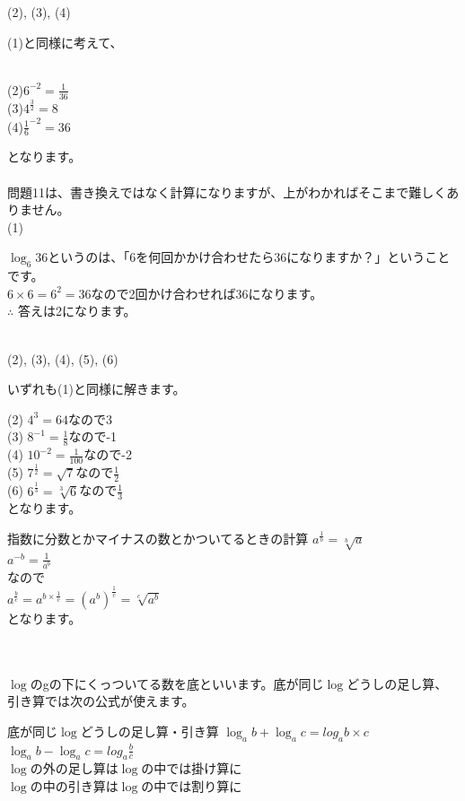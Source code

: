 \documentclass{jsarticle}
\newenvironment{indentblock}{\begin{adjustwidth}{\parindent}{}\hspace{-\parindent}}{\end{adjustwidth}}
\begin{document}
(2), (3), (4)\par
(1)と同様に考えて、\\
\begin{indentblock}\\
(2)$6^{-2}=\frac{1}{36}$\\
(3)$4^{\frac{3}{2}}=8$\\
(4)$\frac{1}{6}^{-2}=36$\\
\end{indentblock}
となります。\\
\hrulefill\\
問題11は、書き換えではなく計算になりますが、上がわかればそこまで難しくありません。\\
(1)
\begin{indentblock}
$\log_6 36$というのは、「6を何回かかけ合わせたら36になりますか？」ということです。\\
$6 \times 6=6^2=36$なので2回かけ合わせれば36になります。\\
$\therefore$ 答えは2になります。
\end{indentblock}
\dotfill\\
(2), (3), (4), (5), (6)\par
いずれも(1)と同様に解きます。
\begin{indentblock}
(2) $4^3=64$なので3\\
(3) $8^{-1}=\frac{1}{8}$なので-1\\
(4) $10^{-2}=\frac{1}{100}$なので-2\\
(5) $7^{\frac{1}{2}}=\sqrt{7}$なので$\frac{1}{2}$\\
(6) $6^{\frac{1}{3}}=\sqrt[3]{6}$なので$\frac{1}{3}$\\
となります。
\end{indentblock}
\begin{itembox}[l]{指数に分数とかマイナスの数とかついてるときの計算}
$a^{\frac{1}{b}}=\sqrt[b]{a}$\\
$a^{-b}=\frac{1}{a^b}$\\
なので\\
$a^{\frac{b}{c}}=a^{b\times \frac{1}{c}}=(a^b)^{\frac{1}{c}}=\sqrt[c]{a^b}$\\
となります。
\end{itembox}\\
\hrulefill\\
$\log$のgの下にくっついてる数を底といいます。底が同じ$\log$どうしの足し算、引き算では次の公式が使えます。\\
\begin{itembox}[l]{底が同じ$\log$どうしの足し算・引き算}
$\log_a b+\log_a c=log_a b\times c$\\
$\log_a b-\log_a c=log_a \frac{b}{c}$\\
$\log$の外の足し算は$\log$の中では掛け算に\\
$\log$の中の引き算は$\log$の中では割り算に\\
\end{itembox}
\end{document}
